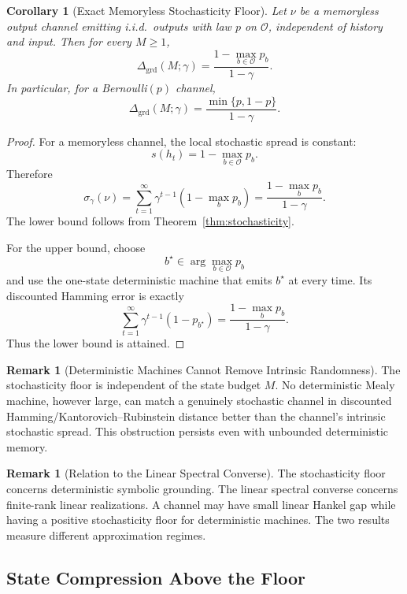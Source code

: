 \documentclass[12pt]{article}
\newtheorem{corollary}[theorem]{Corollary}
\theoremstyle{definition}
\newtheorem{remark}[theorem]{Remark}
\begin{document}
\begin{corollary}[Exact Memoryless Stochasticity Floor]
\label{cor:memoryless-floor}
Let $\nu$ be a memoryless output channel emitting i.i.d.\ outputs with law
$p$ on $\mathcal O$, independent of history and input.  Then for every
$M\ge1$,
\[
\Delta_{\mathrm{grd}}(M;\gamma)
=
\frac{1-\max_{b\in\mathcal O}p_b}{1-\gamma}.
\]
In particular, for a Bernoulli$(p)$ channel,
\[
\Delta_{\mathrm{grd}}(M;\gamma)
=
\frac{\min\{p,1-p\}}{1-\gamma}.
\]
\end{corollary}

\begin{proof}
For a memoryless channel, the local stochastic spread is constant:
\[
s(h_t)=1-\max_{b\in\mathcal O}p_b.
\]
Therefore
\[
\sigma_\gamma(\nu)
=
\sum_{t=1}^\infty
\gamma^{t-1}
\left(1-\max_{b}p_b\right)
=
\frac{1-\max_b p_b}{1-\gamma}.
\]
The lower bound follows from Theorem~\ref{thm:stochasticity}.

For the upper bound, choose
\[
b^\star\in\arg\max_{b\in\mathcal O}p_b
\]
and use the one-state deterministic machine that emits $b^\star$ at every
time.  Its discounted Hamming error is exactly
\[
\sum_{t=1}^\infty
\gamma^{t-1}
(1-p_{b^\star})
=
\frac{1-\max_b p_b}{1-\gamma}.
\]
Thus the lower bound is attained.
\end{proof}


\begin{remark}[Deterministic Machines Cannot Remove Intrinsic Randomness]
\label{rem:stochasticity-meaning}
The stochasticity floor is independent of the state budget $M$.  No
deterministic Mealy machine, however large, can match a genuinely stochastic
channel in discounted Hamming/Kantorovich--Rubinstein distance better than the
channel's intrinsic stochastic spread.  This obstruction persists even with
unbounded deterministic memory.
\end{remark}

\begin{remark}[Relation to the Linear Spectral Converse]
\label{rem:stochasticity-vs-linear}
The stochasticity floor concerns deterministic symbolic grounding.  The linear
spectral converse concerns finite-rank linear realizations.  A channel may have
small linear Hankel gap while having a positive stochasticity floor for
deterministic machines.  The two results measure different approximation
regimes.
\end{remark}

\subsection{State Compression Above the Floor}
\label{subsec:grounding-tracking}
\end{document}
